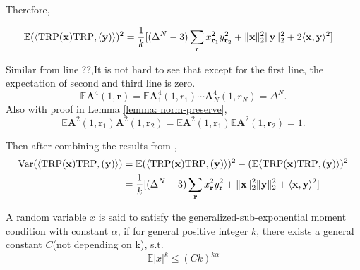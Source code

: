 Therefore, 

\begin{equation}
\begin{aligned}
\mathbb{E}(\langle \textup{TRP}(\mathbf{x}) \textup{TRP},(\mathbf{y}) \rangle)^2 
&= \frac{1}{k} [ (\Delta^N - 3) \sum_{\mathbf{r}}x_{\mathbf{r}_1}^2y_{\mathbf{r}_2}^2  + \|\mathbf{x}\|_2^2\|\mathbf{y}\|^2_2 + 2 \langle \mathbf{x}, \mathbf{y} \rangle^2 ]
\end{aligned} 
\end{equation} 

Similar from line ??,It is not hard to see that except for the first line, the expectation of second and third line is zero. 
\[
\mathbb{E} \mathbf{A}^4(1,\mathbf{r}) = \mathbb{E} \mathbf{A}^4_1 (1, r_1) \cdots \mathbf{A}^4_N(1, r_N) = \Delta^N. 
\]
Also with proof in Lemma \ref{lemma: norm-preserve}, 
\[
\mathbb{E} \mathbf{A}^2(1,\mathbf{r}_1)\mathbf{A}^2(1,\mathbf{r}_2) = \mathbb{E} \mathbf{A}^2(1,\mathbf{r}_1) \mathbb{E}  \mathbf{A}^2(1,\mathbf{r}_2)  = 1.
\]

Then after combining the results from , 
\begin{equation}
\begin{aligned}
\textrm{Var}(\langle \textup{TRP}(\mathbf{x}) \textup{TRP},(\mathbf{y}) \rangle) &= \mathbb{E}(\langle \textup{TRP}(\mathbf{x}) \textup{TRP},(\mathbf{y}) \rangle)^2 - (\mathbb{E}\langle \textup{TRP}(\mathbf{x}) \textup{TRP},(\mathbf{y}) \rangle)^2 \\
&= \frac{1}{k} [ (\Delta^N - 3) \sum_{\mathbf{r}}x_{\mathbf{r}}^2y_{\mathbf{r}}^2  + \|\mathbf{x}\|_2^2\|\mathbf{y}\|^2_2 + \langle \mathbf{x}, \mathbf{y} \rangle^2 ]
\end{aligned}
\end{equation} 


\begin{definition}
	\label{def:generalized-sub-exponential-mc}
	A random variable $x$ is said to satisfy the generalized-sub-exponential moment condition with constant $\alpha$, if for general positive integer $k$, there exists a general constant $C$(not depending on k), s.t. 
	\begin{equation}
	\mathbb{E} |x|^k \le (Ck)^{k \alpha}
	\end{equation}
\end{definition}




\clearpage


